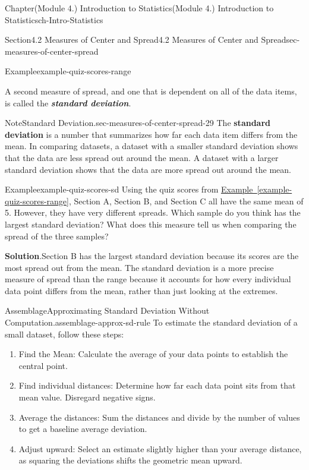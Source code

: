 \documentclass[oneside,10pt,]{book}
\newcommand{\blocktitlefont}{\relax}
\newcommand{\xreffont}{\relax}
\newcommand{\ptxlistdisc}{\raisebox{0.3ex}{\textbullet}}
\newcommand{\alert}[1]{\textbf{\textit{#1}}}
\newcommand{\terminology}[1]{\textbf{#1}}
\begin{document}
\begin{chapterptx}{Chapter}{(Module 4.) Introduction to Statistics}{}{(Module 4.) Introduction to Statistics}{}{}{ch-Intro-Statistics}
\begin{sectionptx}{Section}{4.2 Measures of Center and Spread}{}{4.2 Measures of Center and Spread}{}{}{sec-measures-of-center-spread}
\begin{example}{Example}{}{example-quiz-scores-range}
\begin{itemize}[label=\ptxlistdisc]
\end{itemize}
%
\end{example}
A second measure of spread, and one that is dependent on all of the data items, is called the \alert{standard deviation}.%
\begin{note}{Note}{Standard Deviation.}{sec-measures-of-center-spread-29}%
The \terminology{standard deviation}  is a number that summarizes how far each data item differs from the mean. In comparing datasets, a dataset with a smaller standard deviation shows that the data are less spread out around the mean. A dataset with a larger standard deviation shows that the data are more spread out around the mean.%
\end{note}
\begin{example}{Example}{}{example-quiz-scores-sd}%
Using the quiz scores from \hyperref[example-quiz-scores-range]{Example~{\xreffont\ref{example-quiz-scores-range}}}, Section A, Section B, and Section C all have the same mean of 5. However, they have very different spreads. Which sample do you think has the largest standard deviation? What does this measure tell us when comparing the spread of the three samples?%
\par\smallskip%
\noindent\textbf{\blocktitlefont Solution}.\hypertarget{example-quiz-scores-sd-2}{}\quad{}Section B has the largest standard deviation because its scores are the most spread out from the mean. The standard deviation is a more precise measure of spread than the range because it accounts for how every individual data point differs from the mean, rather than just looking at the extremes.%
\end{example}
\begin{assemblage}{Assemblage}{Approximating Standard Deviation Without Computation.}{assemblage-approx-sd-rule}%
To estimate the standard deviation of a small dataset, follow these steps:%
\par
%
\begin{enumerate}
\item{}Find the Mean: Calculate the average of your data points to establish the central point.%
\item{}Find individual distances: Determine how far each data point sits from that mean value. Disregard negative signs.%
\item{}Average the distances: Sum the distances and divide by the number of values to get a baseline average deviation.%
\item{}Adjust upward: Select an estimate slightly higher than your average distance, as squaring the deviations shifts the geometric mean upward.%

\end{enumerate}
\end{assemblage}
\end{sectionptx}
\end{chapterptx}
\end{document}

